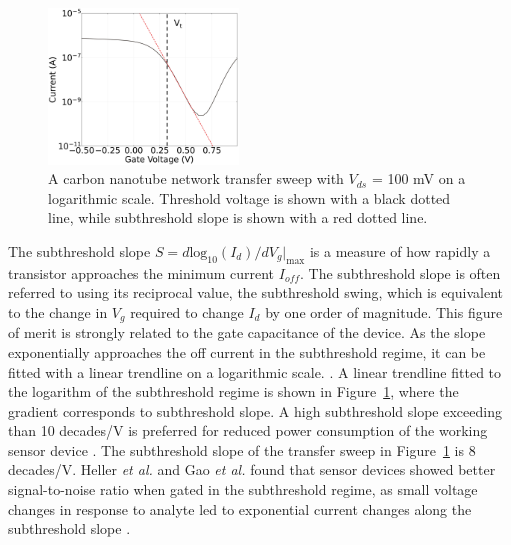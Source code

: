\documentclass[
  a4paper,
]{scrbook}
\begin{document}
\begin{figure}

{\centering \includegraphics[width=0.45\textwidth,height=\textheight]{figures/ch2/NTQ31C5ch1subthreshold_slope_alt.png}

}

\caption[Liquid-gated transfer characteristics of a CNT FET channel on a
logarithmic scale, showing subthreshold slope and threshold
voltage.]{\label{fig-subthreshold-slope}A carbon nanotube network
transfer sweep with \(V_{ds}\) = 100 mV on a logarithmic scale.
Threshold voltage is shown with a black dotted line, while subthreshold
slope is shown with a red dotted line.}

\end{figure}

The subthreshold slope
\(S = d\textrm{log}_{10}(I_{d})/dV_g|_{\textrm{max}}\) is a measure of
how rapidly a transistor approaches the minimum current \(I_{off}\). The
subthreshold slope is often referred to using its reciprocal value, the
subthreshold swing, which is equivalent to the change in \(V_g\)
required to change \(I_d\) by one order of magnitude. This figure of
merit is strongly related to the gate capacitance of the device. As the
slope exponentially approaches the off current in the subthreshold
regime, it can be fitted with a linear trendline on a logarithmic scale.
\autocite{Sze2006,Petti2016}. A linear trendline fitted to the logarithm
of the subthreshold regime is shown in
Figure~\ref{fig-subthreshold-slope}, where the gradient corresponds to
subthreshold slope. A high subthreshold slope exceeding than 10
decades/V is preferred for reduced power consumption of the working
sensor device \autocite{Petti2016}. The subthreshold slope of the
transfer sweep in Figure~\ref{fig-subthreshold-slope} is 8 decades/V.
Heller \emph{et al.} and Gao \emph{et al.} found that sensor devices
showed better signal-to-noise ratio when gated in the subthreshold
regime, as small voltage changes in response to analyte led to
exponential current changes along the subthreshold slope
\autocite{Heller2009,Gao2010}.
\end{document}
